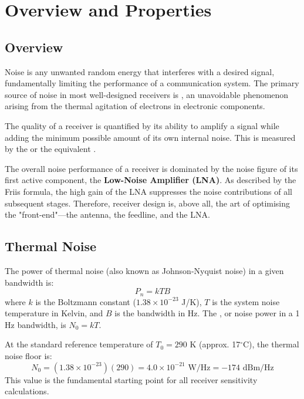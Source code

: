 \section{Overview and Properties}

\subsection{Overview}

Noise is any unwanted random energy that interferes with a desired signal, fundamentally limiting the performance of a communication system. The primary source of noise in most well-designed receivers is , an unavoidable phenomenon arising from the thermal agitation of electrons in electronic components.

The quality of a receiver is quantified by its ability to amplify a signal while adding the minimum possible amount of its own internal noise. This is measured by the  or the equivalent .

\begin{keyconcept}
    The overall noise performance of a receiver is dominated by the noise figure of its first active component, the \textbf{Low-Noise Amplifier (LNA)}. As described by the Friis formula, the high gain of the LNA suppresses the noise contributions of all subsequent stages. Therefore, receiver design is, above all, the art of optimising the "front-end"---the antenna, the feedline, and the LNA.
\end{keyconcept}


\subsection{Thermal Noise}

The power of thermal noise (also known as Johnson-Nyquist noise) in a given bandwidth is:
\begin{equation}
    P_n = kTB
\end{equation}
where $k$ is the Boltzmann constant ($1.38 \times 10^{-23}$ J/K), $T$ is the system noise temperature in Kelvin, and $B$ is the bandwidth in Hz. The , or noise power in a 1 Hz bandwidth, is $N_0 = kT$.

At the standard reference temperature of $T_0 = 290$ K (approx. 17$^\circ$C), the thermal noise floor is:
\[ N_0 = (1.38 \times 10^{-23})(290) = 4.0 \times 10^{-21} \text{ W/Hz} = -174 \text{ dBm/Hz} \]
This value is the fundamental starting point for all receiver sensitivity calculations.


